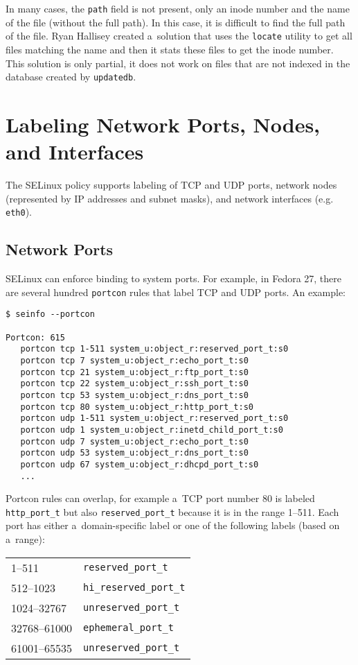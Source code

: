 In many cases, the \texttt{path} field is not present, only an inode number and
the name of the file (without the full path). In this case, it is difficult to
find the full path of the file. Ryan Hallisey created a~solution
\cite{restoreconpullreq} that uses the \texttt{locate} utility to get all files
matching the name and then it stats these files to get the inode number. This
solution is only partial, it does not work on files that are not indexed in the
database created by \texttt{updatedb}.

\section{Labeling Network Ports, Nodes, and Interfaces}
\label{networkobjects}
The SELinux policy supports labeling of TCP and UDP ports, network nodes
(represented by IP addresses and subnet masks), and network interfaces (e.g.
\texttt{eth0}).

\subsection{Network Ports}
SELinux can enforce binding to system ports. For example, in Fedora 27, there
are several hundred \texttt{portcon} rules that label TCP and UDP ports.
An example:
\begin{lstlisting}
$ seinfo --portcon

Portcon: 615
   portcon tcp 1-511 system_u:object_r:reserved_port_t:s0
   portcon tcp 7 system_u:object_r:echo_port_t:s0
   portcon tcp 21 system_u:object_r:ftp_port_t:s0
   portcon tcp 22 system_u:object_r:ssh_port_t:s0
   portcon tcp 53 system_u:object_r:dns_port_t:s0
   portcon tcp 80 system_u:object_r:http_port_t:s0
   portcon udp 1-511 system_u:object_r:reserved_port_t:s0
   portcon udp 1 system_u:object_r:inetd_child_port_t:s0
   portcon udp 7 system_u:object_r:echo_port_t:s0
   portcon udp 53 system_u:object_r:dns_port_t:s0
   portcon udp 67 system_u:object_r:dhcpd_port_t:s0
   ...
\end{lstlisting}
Portcon rules can overlap, for example a~TCP port number 80 is labeled
\texttt{http\_port\_t} but also \texttt{reserved\_port\_t} because it is in the
range 1--511. Each port has either a~domain-specific label or one of the
following labels (based on a~range):

\begin{tabular}{l l}
    1--511 & \texttt{reserved\_port\_t} \\
    512--1023 & \texttt{hi\_reserved\_port\_t} \\
    1024--32767 & \texttt{unreserved\_port\_t} \\
    32768--61000 & \texttt{ephemeral\_port\_t} \\
    61001--65535 & \texttt{unreserved\_port\_t} \\
\end{tabular}

